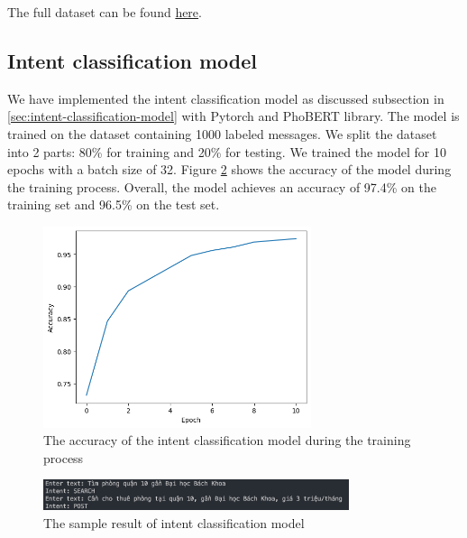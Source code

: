 The full dataset can be found \href{https://www.kaggle.com/datasets/ef8770394a7256fd4e5270fd4a3692235a620fc85ac18128efd1b44d31aa5b1b}{here}.

\subsection{Intent classification model}
We have implemented the intent classification model as discussed subsection in \ref{sec:intent-classification-model} with Pytorch and PhoBERT library. The model is trained on the dataset containing 1000 labeled messages. We split the dataset into 2 parts: 80\% for training and 20\% for testing. We trained the model for 10 epochs with a batch size of 32. Figure \ref{fig:intent-classification-result} shows the accuracy of the model during the training process. Overall, the model achieves an accuracy of 97.4\% on the training set and 96.5\% on the test set. 

\begin{figure}[ht]
    \centering
    \includegraphics[width=0.7\textwidth]{Images/9.Implementation/intent_classifier_accuracy.png} 
    \caption{The accuracy of the intent classification model during the training process}
    \label{fig:intent-classification-accuracy}
\end{figure}

\begin{figure}[ht]
    \centering
    \includegraphics[width=0.8\textwidth]{Images/9.Implementation/intent_classifier_result.png}
    \caption{The sample result of intent classification model}
    \label{fig:intent-classification-result}
\end{figure}


